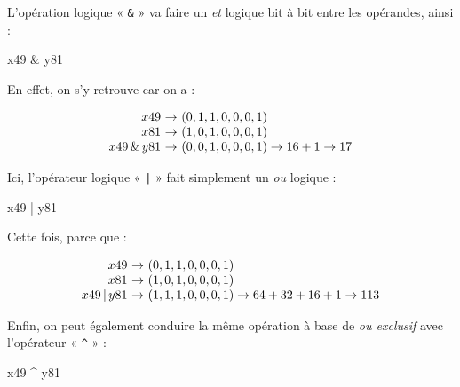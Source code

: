 L'opération logique « \texttt{\&} » va faire un \textit{et} logique bit à bit entre les opérandes, ainsi :

\begin{idleconsole}
	\begin{pyconsole}
		x49 & y81
	\end{pyconsole}
\end{idleconsole}

En effet, on s'y retrouve car on a :

\vspace{-0.7\baselineskip}
\begin{equation}
\begin{array}{r@{~}c@{~}l}
x49 & \rightarrow & (0, 1, 1, 0, 0, 0, 1) \\
x81 & \rightarrow & (1, 0, 1, 0, 0, 0, 1) \\
x49\, \&\, y81 &\rightarrow & (0, 0, 1, 0, 0, 0, 1) \rightarrow 16 + 1 \rightarrow 17
\end{array}
\end{equation}

Ici, l'opérateur logique « \texttt{|} » fait simplement un \textit{ou} logique :

\begin{idleconsole}
	\begin{pyconsole}
		x49 | y81
	\end{pyconsole}
\end{idleconsole}

Cette fois, parce que :

\vspace{-0.7\baselineskip}
\begin{equation}
\begin{array}{r@{~}c@{~}l}
x49 & \rightarrow & (0, 1, 1, 0, 0, 0, 1) \\
x81 & \rightarrow & (1, 0, 1, 0, 0, 0, 1) \\
x49\, | \, y81 &\rightarrow & (1, 1, 1, 0, 0, 0, 1) \rightarrow 64 + 32 + 16 + 1 \rightarrow 113
\end{array}
\end{equation}

Enfin, on peut également conduire la même opération à base de \textit{ou exclusif} avec l'opérateur « \texttt{\^{}} » :

\begin{idleconsole}
	\begin{pyconsole}
		x49 ^ y81
	\end{pyconsole}
\end{idleconsole}

